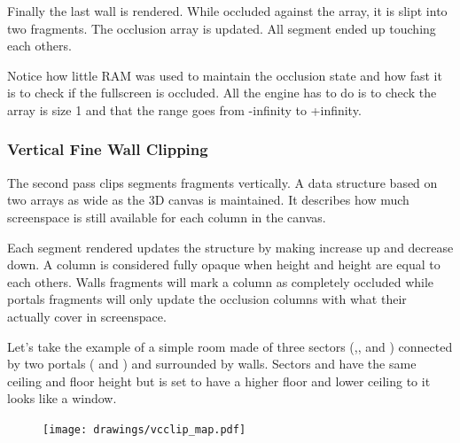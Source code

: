 Finally the last wall is rendered. While occluded against the array, it is slipt into two fragments. The occlusion array is updated. All segment ended up touching each others. 
\begin{minipage}{0.54\textwidth}
\vspace*{2.5mm}
\end{minipage}
\begin{minipage}{0.46\textwidth}
\centering
{}
\end{minipage}
\par
Notice how little RAM was used to maintain the occlusion state and how fast it is to check if the fullscreen is occluded. All the engine has to do is to check the array is size 1 and that the range goes from -infinity to +infinity.


\subsubsection{Vertical Fine Wall Clipping}
The second pass clips segments fragments vertically. A data structure based on two arrays as wide as the 3D canvas is maintained. It describes how much screenspace is still available for each column in the canvas.\\
\par
 Each segment rendered updates the structure by making  increase up  and  decrease down. A column is considered fully opaque when  height and  height are equal to each others. Walls fragments will mark a column as completely occluded while portals fragments will only update the occlusion columns with what their actually cover in screenspace.\\
\par
{}
\par
Let's take the example of a simple room made of three sectors (,, and ) connected by two portals ( and ) and surrounded by walls. Sectors  and  have the same ceiling and floor height but  is set to have a higher floor and lower ceiling to it looks like a window.\\
\par

\begin{figure}
\centering
\texttt{[image: drawings/vcclip\_map.pdf]}
\end{figure}


